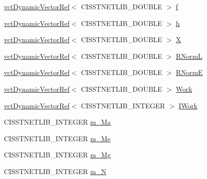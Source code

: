 \begin{DoxyCompactItemize}
\item 
\hyperlink{classvct_dynamic_vector_ref}{vct\+Dynamic\+Vector\+Ref}$<$ C\+I\+S\+S\+T\+N\+E\+T\+L\+I\+B\+\_\+\+D\+O\+U\+B\+L\+E $>$ \hyperlink{classnmr_l_sq_lin_solution_dynamic_a218e6ab273eb85a0bc7d44560c5d6b4f}{f}
\item 
\hyperlink{classvct_dynamic_vector_ref}{vct\+Dynamic\+Vector\+Ref}$<$ C\+I\+S\+S\+T\+N\+E\+T\+L\+I\+B\+\_\+\+D\+O\+U\+B\+L\+E $>$ \hyperlink{classnmr_l_sq_lin_solution_dynamic_a97ed162438c8ef72a0348e323c4b75d8}{h}
\item 
\hyperlink{classvct_dynamic_vector_ref}{vct\+Dynamic\+Vector\+Ref}$<$ C\+I\+S\+S\+T\+N\+E\+T\+L\+I\+B\+\_\+\+D\+O\+U\+B\+L\+E $>$ \hyperlink{classnmr_l_sq_lin_solution_dynamic_a170954053506de199dd1636a50107538}{X}
\item 
\hyperlink{classvct_dynamic_vector_ref}{vct\+Dynamic\+Vector\+Ref}$<$ C\+I\+S\+S\+T\+N\+E\+T\+L\+I\+B\+\_\+\+D\+O\+U\+B\+L\+E $>$ \hyperlink{classnmr_l_sq_lin_solution_dynamic_a22c21675797a08a3c2eebcc434349b52}{R\+Norm\+L}
\item 
\hyperlink{classvct_dynamic_vector_ref}{vct\+Dynamic\+Vector\+Ref}$<$ C\+I\+S\+S\+T\+N\+E\+T\+L\+I\+B\+\_\+\+D\+O\+U\+B\+L\+E $>$ \hyperlink{classnmr_l_sq_lin_solution_dynamic_a926199076fae2e60b277da1c65d2cbb6}{R\+Norm\+E}
\item 
\hyperlink{classvct_dynamic_vector_ref}{vct\+Dynamic\+Vector\+Ref}$<$ C\+I\+S\+S\+T\+N\+E\+T\+L\+I\+B\+\_\+\+D\+O\+U\+B\+L\+E $>$ \hyperlink{classnmr_l_sq_lin_solution_dynamic_ae9c178092a5766140b996fa2f0287a06}{Work}
\item 
\hyperlink{classvct_dynamic_vector_ref}{vct\+Dynamic\+Vector\+Ref}$<$ C\+I\+S\+S\+T\+N\+E\+T\+L\+I\+B\+\_\+\+I\+N\+T\+E\+G\+E\+R $>$ \hyperlink{classnmr_l_sq_lin_solution_dynamic_a19d6282ccc51cf567872e789d8c29596}{I\+Work}
\item 
C\+I\+S\+S\+T\+N\+E\+T\+L\+I\+B\+\_\+\+I\+N\+T\+E\+G\+E\+R \hyperlink{classnmr_l_sq_lin_solution_dynamic_a9bfadf22c69040131bce764301e97ce6}{m\+\_\+\+Ma}
\item 
C\+I\+S\+S\+T\+N\+E\+T\+L\+I\+B\+\_\+\+I\+N\+T\+E\+G\+E\+R \hyperlink{classnmr_l_sq_lin_solution_dynamic_abeeeaca937501adb125e9c443c01c558}{m\+\_\+\+Me}
\item 
C\+I\+S\+S\+T\+N\+E\+T\+L\+I\+B\+\_\+\+I\+N\+T\+E\+G\+E\+R \hyperlink{classnmr_l_sq_lin_solution_dynamic_aadece8538a491ae3b8496d982fa1a877}{m\+\_\+\+Mg}
\item 
C\+I\+S\+S\+T\+N\+E\+T\+L\+I\+B\+\_\+\+I\+N\+T\+E\+G\+E\+R \hyperlink{classnmr_l_sq_lin_solution_dynamic_a872f898501930333c14736fac245a464}{m\+\_\+\+N}
\end{DoxyCompactItemize}
